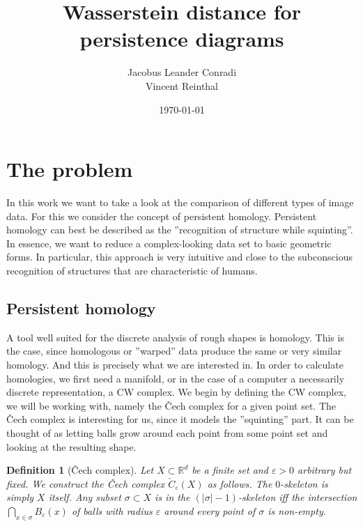 \documentclass[11pt, a4paper, UKenglish]{article}
\author{Jacobus Leander Conradi\\Vincent Reinthal}
\date{\today}
\title{Wasserstein distance for persistence diagrams}
\newtheorem{definition}{Definition}
\newcommand{\bR}{\mathbb{R}}
\begin{document}
    \maketitle

	
    \thispagestyle{plain}
    \addtocounter{page}{-1}
    \tableofcontents
    \vfil\null
    \clearpage
    \thispagestyle{empty}\mbox{}
    \clearpage

    \section{The problem}\label{sec:the-problem}
    In this work we want to take a look at the comparison of different types of image data.
    For this we consider the concept of persistent homology.
    Persistent homology can best be described as the ''recognition of structure while squinting''.
    In essence, we want to reduce a complex-looking data set to basic geometric forms.
    In particular, this approach is very intuitive and close to the subconscious recognition of structures that are characteristic of humans.


    \subsection{Persistent homology}\label{subsec:persistent-homology}
    A tool well suited for the discrete analysis of rough shapes is homology.
    This is the case, since homologous or ''warped'' data produce the same or very similar homology.
    And this is precisely what we are interested in.
    In order to calculate homologies, we first need a manifold, or in the case of a computer a necessarily discrete representation, a CW complex.
    We begin by defining the CW complex, we will be working with, namely the Čech complex for a given point set.
    The Čech complex is interesting for us, since it models the ''squinting'' part.
    It can be thought of as letting balls grow around each point from some point set and looking at the resulting shape.

    \begin{definition}[Čech complex]
        Let $X\subset \bR^d$ be a finite set and $\varepsilon>0$ arbitrary but fixed.
        We construct the Čech complex $\check C_\varepsilon(X)$ as follows.
        The $0$-skeleton is simply $X$ itself.
        Any subset $\sigma\subset X$ is in the $(|\sigma|-1)$-skeleton iff the intersection $\bigcap_{x\in\sigma}B_\varepsilon(x)$ of balls with radius $\varepsilon$ around every point of $\sigma$ is non-empty.
    \end{definition}
\end{document}
